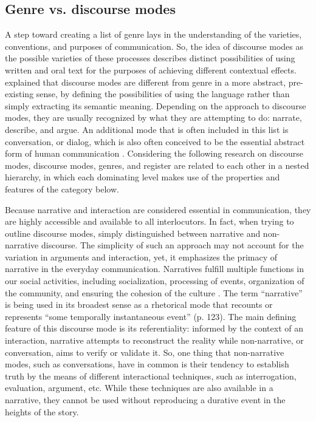 \documentclass[12pt, draft]{article}
\begin{document}
\subsection{Genre vs. discourse modes}
A step toward creating a list of genre lays in the understanding of the varieties, conventions, and purposes of communication. So, the idea of discourse modes as the possible varieties of these processes describes distinct possibilities of using written and oral text for the purposes of achieving different contextual effects. \textcite[p. 54]{bax2011} explained that discourse modes are different from genre in a more abstract, pre-existing sense, by defining the possibilities of using the language rather than simply extracting its semantic meaning. Depending on the approach to discourse modes, they are usually recognized by what they are attempting to do: narrate, describe, and argue. An additional mode that is often included in this list is conversation, or dialog, which is also often conceived to be the essential abstract form of human communication \parencite{bakhtin1986, bax2011}. Considering the following research on discourse modes, discourse modes, genres, and register are related to each other in a nested hierarchy, in which each dominating level makes use of the properties and features of the category below.

Because narrative and interaction are considered essential in communication, they are highly accessible and available to all interlocutors.  In fact, when trying to outline discourse modes, \textcite{georgakopoulou2000} simply distinguished between narrative and non-narrative discourse. The simplicity of such an approach may not account for the variation in arguments and interaction, yet, it emphasizes the primacy of narrative in the everyday communication. Narratives fulfill multiple functions in our social activities, including socialization, processing of events, organization of the community, and ensuring the cohesion of the culture \parencite{georgakopoulou2000}. The term ``narrative'' is being used in its broadest sense as a rhetorical mode that recounts or represents ``some temporally instantaneous event'' (p. 123). The main defining feature of this discourse mode is its referentiality: informed by the context of an interaction, narrative attempts to reconstruct the reality while non-narrative, or conversation, aims to verify or validate it. So, one thing that non-narrative modes, such as conversations, have in common is their tendency to establish truth by the means of different interactional techniques, such as interrogation, evaluation, argument, etc. While these techniques are also available in a narrative, they cannot be used without reproducing a durative event in the heights of the story. 
\end{document}
